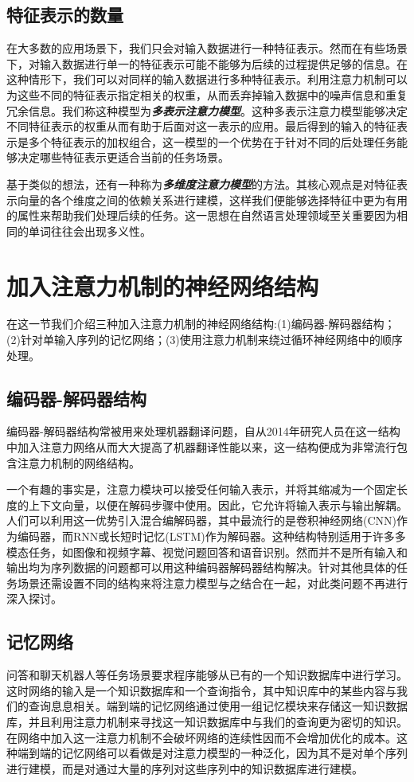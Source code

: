 \documentclass{ctexart}
\begin{document}
\subsection{特征表示的数量}
在大多数的应用场景下，我们只会对输入数据进行一种特征表示。然而在有些场景下，对输入数据进行单一的特征表示可能不能够为后续的过程提供足够的信息。在这种情形下，我们可以对同样的输入数据进行多种特征表示。利用注意力机制可以为这些不同的特征表示指定相关的权重，从而丢弃掉输入数据中的噪声信息和重复冗余信息。我们称这种模型为\textbf{\textit{多表示注意力模型}}。这种多表示注意力模型能够决定不同特征表示的权重从而有助于后面对这一表示的应用。最后得到的输入的特征表示是多个特征表示的加权组合，这一模型的一个优势在于针对不同的后处理任务能够决定哪些特征表示更适合当前的任务场景。


基于类似的想法，还有一种称为\textbf{\textit{多维度注意力模型}}的方法。其核心观点是对特征表示向量的各个维度之间的依赖关系进行建模，这样我们便能够选择特征中更为有用的属性来帮助我们处理后续的任务。这一思想在自然语言处理领域至关重要因为相同的单词往往会出现多义性。
\section{加入注意力机制的神经网络结构}
在这一节我们介绍三种加入注意力机制的神经网络结构:(1)编码器-解码器结构；(2)针对单输入序列的记忆网络；(3)使用注意力机制来绕过循环神经网络中的顺序处理。
\subsection{编码器-解码器结构}
编码器-解码器结构常被用来处理机器翻译问题，自从2014年研究人员在这一结构中加入注意力网络从而大大提高了机器翻译性能以来，这一结构便成为非常流行包含注意力机制的网络结构。


一个有趣的事实是，注意力模块可以接受任何输入表示，并将其缩减为一个固定长度的上下文向量，以便在解码步骤中使用。因此，它允许将输入表示与输出解耦。人们可以利用这一优势引入混合编解码器，其中最流行的是卷积神经网络(CNN)作为编码器，而RNN或长短时记忆(LSTM)作为解码器。这种结构特别适用于许多多模态任务，如图像和视频字幕、视觉问题回答和语音识别。然而并不是所有输入和输出均为序列数据的问题都可以用这种编码器解码器结构解决。针对其他具体的任务场景还需设置不同的结构来将注意力模型与之结合在一起，对此类问题不再进行深入探讨。
\subsection{记忆网络}
问答和聊天机器人等任务场景要求程序能够从已有的一个知识数据库中进行学习。这时网络的输入是一个知识数据库和一个查询指令，其中知识库中的某些内容与我们的查询息息相关。端到端的记忆网络通过使用一组记忆模块来存储这一知识数据库，并且利用注意力机制来寻找这一知识数据库中与我们的查询更为密切的知识。在网络中加入这一注意力机制不会破坏网络的连续性因而不会增加优化的成本。这种端到端的记忆网络可以看做是对注意力模型的一种泛化，因为其不是对单个序列进行建模，而是对通过大量的序列对这些序列中的知识数据库进行建模。
\end{document}
